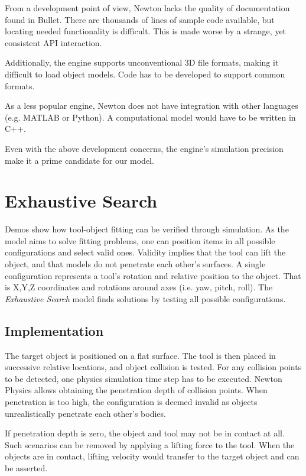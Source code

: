 \documentclass[11]{article}
\begin{document}
From a development point of view, Newton lacks the quality of documentation found in Bullet. 
There are thousands of lines of sample code available, but locating needed functionality is difficult. 
This is made worse by a strange, yet consistent API interaction.

Additionally, the engine supports unconventional 3D file formats, making it difficult to load object models.
Code has to be developed to support common formats.

As a less popular engine, Newton does not have integration with other languages (e.g. MATLAB or Python). 
A computational model would have to be written in C++.

Even with the above development concerns, the engine's simulation precision make it a prime candidate for our model.  

\section{Exhaustive Search}
Demos show how tool-object fitting can be verified through simulation.
As the model aims to solve fitting problems, one can position items in all possible configurations and select valid ones. 
Validity implies that the tool can lift the object, and that models do not penetrate each other's surfaces.
A single configuration represents a tool's rotation and relative position to the object.
That is X,Y,Z coordinates and rotations around axes (i.e. yaw, pitch, roll). 
The \emph{Exhaustive Search} model finds solutions by testing all possible configurations.

\subsection{Implementation}
The target object is positioned on a flat surface. 
The tool is then placed in successive relative locations, and object collision is tested. 
For any collision points to be detected, one physics simulation time step has to be executed.
Newton Physics allows obtaining the penetration depth of collision points. 
When penetration is too high, the configuration is deemed invalid as objects unrealistically penetrate each other's bodies.

If penetration depth is zero, the object and tool may not be in contact at all. 
Such scenarios can be removed by applying a lifting force to the tool.
When the objects are in contact, lifting velocity would transfer to the target object and can be asserted. 
\end{document}
